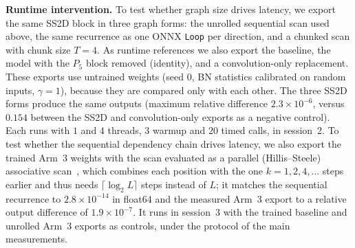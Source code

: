 \textbf{Runtime intervention.} To test whether graph size drives latency, we export the same SS2D block in three graph forms: the unrolled sequential scan used above, the same recurrence as one ONNX \texttt{Loop} per direction, and a chunked scan with chunk size $T = 4$. As runtime references we also export the baseline, the model with the $P_5$ block removed (identity), and a convolution-only replacement. These exports use untrained weights (seed $0$, BN statistics calibrated on random inputs, $\gamma = 1$), because they are compared only with each other. The three SS2D forms produce the same outputs (maximum relative difference $2.3 \times 10^{-6}$, versus $0.154$ between the SS2D and convolution-only exports as a negative control). Each runs with $1$ and $4$ threads, $3$ warmup and $20$ timed calls, in session~2. To test whether the sequential dependency chain drives latency, we also export the trained Arm~3 weights with the scan evaluated as a parallel (Hillis--Steele) associative scan~\cite{blelloch1990prefix}, which combines each position with the one $k = 1, 2, 4, \dots$ steps earlier and thus needs $\lceil \log_2 L \rceil$ steps instead of $L$; it matches the sequential recurrence to $2.8 \times 10^{-14}$ in float64 and the measured Arm~3 export to a relative output difference of $1.9 \times 10^{-7}$. It runs in session~3 with the trained baseline and unrolled Arm~3 exports as controls, under the protocol of the main measurements.
